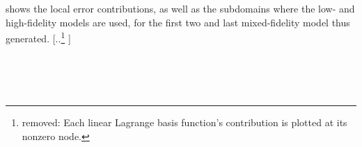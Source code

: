 \documentclass[review]{siamart0516}
\providecommand{\DIFdeltex}[1]{{\protect\color{red} [..\footnote{removed: #1} ]}} %
\providecommand{\DIFdelbegin}{} %
\providecommand{\DIFdelend}{} %
\providecommand{\DIFdel}[1]{\texorpdfstring{\DIFdeltex{#1}}{}} %
\newcommand{\DIFscaledelfig}{0.5}
\newlength{\DIFdelgraphicswidth} %
\newlength{\DIFdelgraphicsheight} %
\newcommand{\DIFdelincludegraphics}[2][]{%
\sbox{\DIFdelgraphicsbox}{\DIFOincludegraphics[#1]{#2}}%
\settoboxwidth{\DIFdelgraphicswidth}{\DIFdelgraphicsbox} %
\settoboxtotalheight{\DIFdelgraphicsheight}{\DIFdelgraphicsbox} %
\scalebox{\DIFscaledelfig}{%
\parbox[b]{\DIFdelgraphicswidth}{\usebox{\DIFdelgraphicsbox}\\[-\baselineskip] \rule{\DIFdelgraphicswidth}{0em}}\llap{\resizebox{\DIFdelgraphicswidth}{\DIFdelgraphicsheight}{%
\setlength{\unitlength}{\DIFdelgraphicswidth}%
\begin{picture}(1,1)%
\thicklines\linethickness{2pt} %
{\color[rgb]{1,0,0}\put(0,0){\framebox(1,1){}}}%
{\color[rgb]{1,0,0}\put(0,0){\line( 1,1){1}}}%
{\color[rgb]{1,0,0}\put(0,1){\line(1,-1){1}}}%
\end{picture}%
}\hspace*{3pt}}} %
} %
\DeclareRobustCommand{\DIFdelbegin}{\DIFOdelbegin \let\includegraphics\DIFdelincludegraphics} %
\DeclareRobustCommand{\DIFdelend}{\DIFOaddend \let\includegraphics\DIFOincludegraphics} %
\begin{document}
 shows the local error contributions, as well as the subdomains where the low- and high-fidelity models are used, for the first two and last mixed-fidelity model thus generated. 
\DIFdelbegin \DIFdel{Each linear Lagrange basis function's contribution is plotted at its nonzero node. %
}\DIFdelend %
\begin{figure}[htbp]
\centering
{} \\
 \\
 \\

\end{figure}
\end{document}
